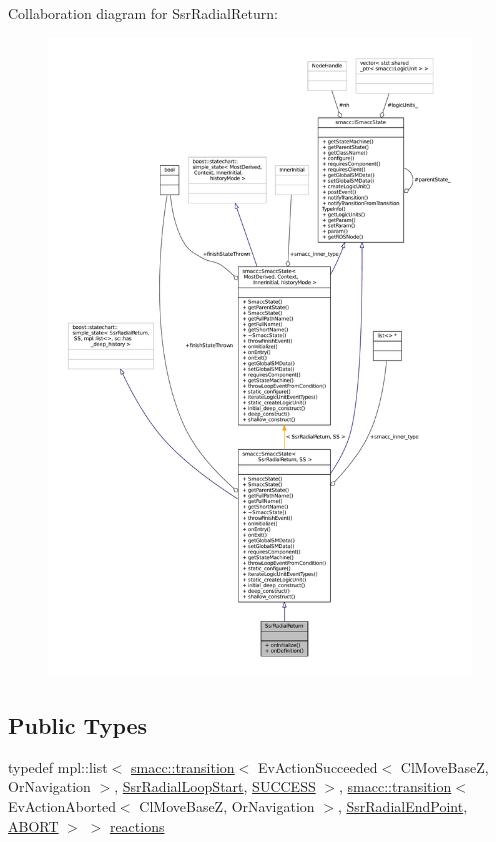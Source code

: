 Collaboration diagram for Ssr\+Radial\+Return\+:
\nopagebreak
\begin{figure}[H]
\begin{center}
\leavevmode
\includegraphics[width=350pt]{structSsrRadialReturn__coll__graph}
\end{center}
\end{figure}
\subsection*{Public Types}
\begin{DoxyCompactItemize}
\item 
typedef mpl\+::list$<$ \hyperlink{classsmacc_1_1transition}{smacc\+::transition}$<$ Ev\+Action\+Succeeded$<$ Cl\+Move\+BaseZ, Or\+Navigation $>$, \hyperlink{structSsrRadialLoopStart}{Ssr\+Radial\+Loop\+Start}, \hyperlink{classSUCCESS}{S\+U\+C\+C\+E\+SS} $>$, \hyperlink{classsmacc_1_1transition}{smacc\+::transition}$<$ Ev\+Action\+Aborted$<$ Cl\+Move\+BaseZ, Or\+Navigation $>$, \hyperlink{structSsrRadialEndPoint}{Ssr\+Radial\+End\+Point}, \hyperlink{classABORT}{A\+B\+O\+RT} $>$ $>$ \hyperlink{structSsrRadialReturn_a927ba4a246b63494beb537c5e300ef53}{reactions}
\end{DoxyCompactItemize}
